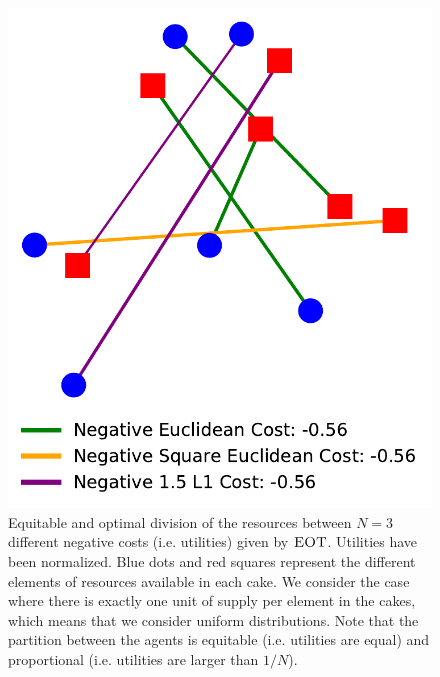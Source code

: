 
\begin{figure}[h!]
\centering
\includegraphics[width=0.3\linewidth]{sections/appendix/aistats2021_eot/figures/primal_W_1_2_3_neg_norm.pdf}
\caption{Equitable and optimal division of the resources between $N=3$ different negative costs (i.e. utilities) given by $\textsc{EOT}$. Utilities have been normalized. Blue dots and red squares represent the different elements of resources available in each cake. We consider the case where there is exactly one unit of supply per element in the cakes, which means that we consider uniform distributions. Note that the partition between the agents is equitable (i.e. utilities are equal) and proportional (i.e. utilities are larger than $1/N$).}
\label{fig:transport-map}
\end{figure}



